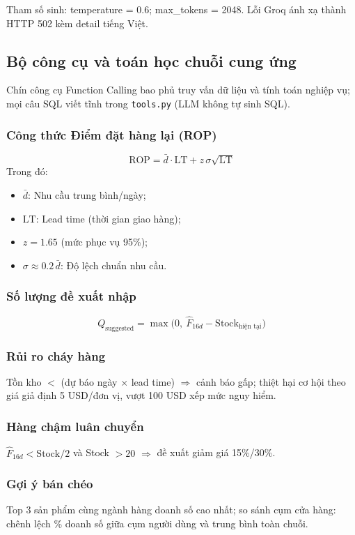 \documentclass[12pt,a4paper]{report}
\begin{document}
Tham số sinh: temperature = 0.6; max\_tokens = 2048. Lỗi Groq ánh xạ thành HTTP 502 kèm detail tiếng Việt.

\subsection{Bộ công cụ và toán học chuỗi cung ứng}

Chín công cụ Function Calling bao phủ truy vấn dữ liệu và tính toán nghiệp vụ; mọi câu SQL viết tĩnh trong \texttt{tools.py} (LLM không tự sinh SQL).

\subsubsection{Công thức Điểm đặt hàng lại (ROP)}
\[
    \mathrm{ROP} = \bar{d}\cdot \mathrm{LT} + z\,\sigma\sqrt{\mathrm{LT}}
\]
Trong đó:
\begin{itemize}
    \item $\bar{d}$: Nhu cầu trung bình/ngày;
    \item $\mathrm{LT}$: Lead time (thời gian giao hàng);
    \item $z = 1.65$ (mức phục vụ 95\%);
    \item $\sigma \approx 0.2\,\bar{d}$: Độ lệch chuẩn nhu cầu.
\end{itemize}

\subsubsection{Số lượng đề xuất nhập}
\[
    Q_{\mathrm{suggested}} = \max\bigl(0,\ \hat{F}_{16d} - \text{Stock}_{\text{hiện tại}}\bigr)
\]

\subsubsection{Rủi ro cháy hàng}
Tồn kho $<$ (dự báo ngày $\times$ lead time) $\Rightarrow$ cảnh báo gấp; thiệt hại cơ hội theo giá giả định 5 USD/đơn vị, vượt 100 USD xếp mức nguy hiểm.

\subsubsection{Hàng chậm luân chuyển}
 $\hat{F}_{16d} < \mathrm{Stock}/2$ và Stock $> 20$ $\Rightarrow$ đề xuất giảm giá 15\%/30\%.

\subsubsection{Gợi ý bán chéo}
Top 3 sản phẩm cùng ngành hàng doanh số cao nhất; so sánh cụm cửa hàng: chênh lệch \% doanh số giữa cụm người dùng và trung bình toàn chuỗi.
\end{document}
